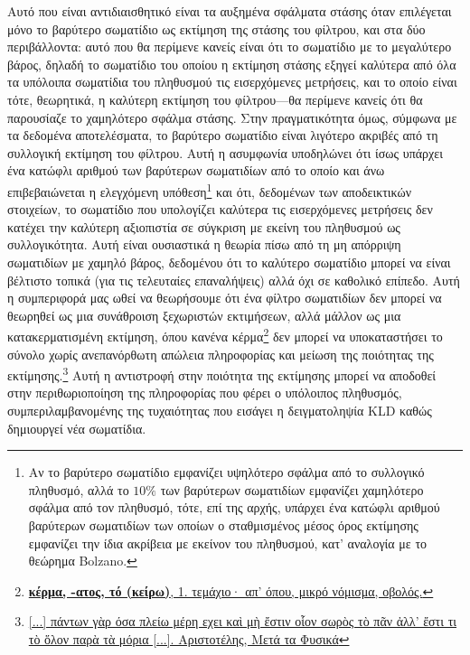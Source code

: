 Αυτό που είναι αντιδιαισθητικό είναι τα αυξημένα σφάλματα στάσης όταν
επιλέγεται μόνο το βαρύτερο σωματίδιο ως εκτίμηση της στάσης του φίλτρου, και
στα δύο περιβάλλοντα: αυτό που θα περίμενε κανείς είναι ότι το σωματίδιο με το
μεγαλύτερο βάρος, δηλαδή το σωματίδιο του οποίου η εκτίμηση στάσης εξηγεί
καλύτερα από όλα τα υπόλοιπα σωματίδια του πληθυσμού τις εισερχόμενες
μετρήσεις, και το οποίο είναι τότε, θεωρητικά, η καλύτερη εκτίμηση του
φίλτρου---θα περίμενε κανείς ότι θα παρουσίαζε το χαμηλότερο σφάλμα στάσης.
Στην πραγματικότητα όμως, σύμφωνα με τα δεδομένα αποτελέσματα, το βαρύτερο
σωματίδιο είναι λιγότερο ακριβές από τη συλλογική εκτίμηση του φίλτρου. Αυτή η
ασυμφωνία υποδηλώνει ότι ίσως υπάρχει ένα κατώφλι αριθμού των βαρύτερων
σωματιδίων από το οποίο και άνω επιβεβαιώνεται η ελεγχόμενη υπόθεση\footnote{Αν
το βαρύτερο σωματίδιο εμφανίζει υψηλότερο σφάλμα από το συλλογικό πληθυσμό,
αλλά το $10\%$ των βαρύτερων σωματιδίων εμφανίζει χαμηλότερο σφάλμα από τον
πληθυσμό, τότε, επί της αρχής, υπάρχει ένα κατώφλι αριθμού βαρύτερων σωματιδίων
των οποίων ο σταθμισμένος μέσος όρος εκτίμησης εμφανίζει την ίδια ακρίβεια με
εκείνον του πληθυσμού, κατ' αναλογία με το θεώρημα Bolzano.} και ότι, δεδομένων
των αποδεικτικών στοιχείων, το σωματίδιο που υπολογίζει καλύτερα τις
εισερχόμενες μετρήσεις δεν κατέχει την καλύτερη αξιοπιστία σε σύγκριση με
εκείνη του πληθυσμού ως συλλογικότητα. Αυτή είναι ουσιαστικά η θεωρία πίσω από
τη μη απόρριψη σωματιδίων με χαμηλό βάρος, δεδομένου ότι το καλύτερο σωματίδιο
μπορεί να είναι βέλτιστο τοπικά (για τις τελευταίες επαναλήψεις) αλλά όχι σε
καθολικό επίπεδο. Αυτή η συμπεριφορά μας ωθεί να θεωρήσουμε ότι ένα φίλτρο
σωματιδίων δεν μπορεί να θεωρηθεί ως μια συνάθροιση ξεχωριστών εκτιμήσεων, αλλά
μάλλον ως μια κατακερματισμένη εκτίμηση, όπου κανένα
κέρμα\footnote{\href{https://www.greek-language.gr/digitalResources/ancient_greek/tools/liddell-scott/search.html?lq=\%CE\%BA\%CE\%AD\%CF\%81\%CE\%BC\%CE\%B1}
{\textbf{κέρμα, -ατος, τό (κείρω)}, 1.  τεμάχιο· απ' όπου, μικρό νόμισμα,
οβολός.}} δεν μπορεί να υποκαταστήσει το σύνολο χωρίς ανεπανόρθωτη απώλεια
πληροφορίας και μείωση της ποιότητας της
εκτίμησης.\footnote{\href{https://bit.ly/3Hw9T12}{[...] πάντων γὰρ όσα πλείω
μέρη εχει καὶ μὴ ἔστιν οἷον σωρὸς τὸ πᾶν ἀλλ' ἔστι τι τὸ ὅλον παρὰ τὰ μόρια
[...]. Αριστοτέλης, Μετά τα Φυσικά}} Αυτή η αντιστροφή στην ποιότητα της
εκτίμησης μπορεί να αποδοθεί στην περιθωριοποίηση της πληροφορίας που φέρει ο
υπόλοιπος πληθυσμός, συμπεριλαμβανομένης της τυχαιότητας που εισάγει η
δειγματοληψία KLD καθώς δημιουργεί νέα σωματίδια.

